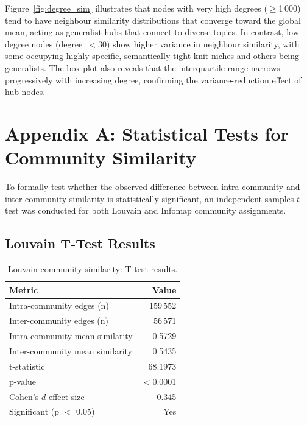 \documentclass[12pt,a4paper]{article}
\begin{document}
Figure~\ref{fig:degree_sim} illustrates that nodes with very high degrees
($\geq$1\,000) tend to have neighbour similarity distributions that converge
toward the global mean, acting as generalist hubs that connect to diverse topics.
In contrast, low-degree nodes (degree~$<$30) show higher variance in neighbour
similarity, with some occupying highly specific, semantically tight-knit niches
and others being generalists.  The box plot also reveals that the interquartile
range narrows progressively with increasing degree, confirming the
variance-reduction effect of hub nodes.

\section{Appendix A: Statistical Tests for Community Similarity}

To formally test whether the observed difference between intra-community and
inter-community similarity is statistically significant, an independent samples
$t$-test was conducted for both Louvain and Infomap community assignments.

\subsection{Louvain T-Test Results}

\begin{table}[H]
\centering
\caption{Louvain community similarity: T-test results.}
\label{tab:louvain_ttest}
\begin{tabular}{lr}
\toprule
\textbf{Metric} & \textbf{Value} \\
\midrule
Intra-community edges (n) & 159\,552 \\
Inter-community edges (n) & 56\,571 \\
Intra-community mean similarity & 0.5729 \\
Inter-community mean similarity & 0.5435 \\
t-statistic & 68.1973 \\
p-value & $<$0.0001 \\
Cohen's $d$ effect size & 0.345 \\
Significant (p $<$ 0.05) & Yes \\
\bottomrule
\end{tabular}
\end{table}
\end{document}
